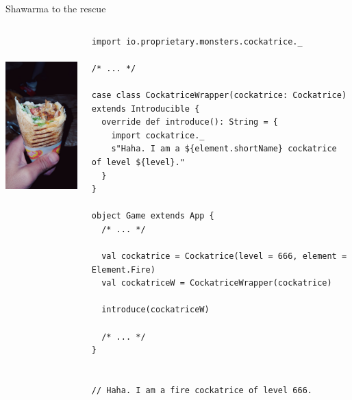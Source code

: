 \documentclass[presentation,aspectratio=169,smaller]{beamer}
\begin{document}
\begin{frame}[label={sec:orgd7058fe},fragile]{Shawarma to the rescue}
 \begin{columns}
\begin{column}{0.25\columnwidth}
\begin{center}
\includegraphics[height=7cm]{images/shawarma.jpg}
\end{center}
\end{column}

\begin{column}{0.75\columnwidth}
\begin{verbatim}
import io.proprietary.monsters.cockatrice._

/* ... */

case class CockatriceWrapper(cockatrice: Cockatrice) extends Introducible {
  override def introduce(): String = {
    import cockatrice._
    s"Haha. I am a ${element.shortName} cockatrice of level ${level}."
  }
}

object Game extends App {
  /* ... */

  val cockatrice = Cockatrice(level = 666, element = Element.Fire)
  val cockatriceW = CockatriceWrapper(cockatrice)

  introduce(cockatriceW)

  /* ... */
}


// Haha. I am a fire cockatrice of level 666.
\end{verbatim}
\end{column}
\end{columns}
\end{frame}
\end{document}
